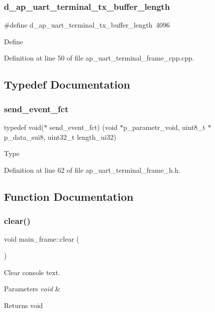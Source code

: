 \subsubsection{d\_ap\_uart\_terminal\_tx\_buffer\_length}
{\footnotesize\ttfamily \#define d\+\_\+ap\+\_\+uart\+\_\+terminal\+\_\+tx\+\_\+buffer\+\_\+length~4096}

Define 

Definition at line 50 of file ap\+\_\+uart\+\_\+terminal\+\_\+frame\+\_\+cpp.\+cpp.



\subsection{Typedef Documentation}
\mbox{\label{group___u_a_r_t__terminal_ga1d68ed9ea85b1c3bb5539abad6d7e4f1}} 
\subsubsection{send\_event\_fct}
{\footnotesize\ttfamily typedef void($\ast$ send\+\_\+event\+\_\+fct) (void $\ast$p\+\_\+parametr\+\_\+void, uint8\+\_\+t $\ast$p\+\_\+data\+\_\+sui8, uint32\+\_\+t length\+\_\+ui32)}

Type 

Definition at line 62 of file ap\+\_\+uart\+\_\+terminal\+\_\+frame\+\_\+h.\+h.



\subsection{Function Documentation}
\mbox{\label{group___u_a_r_t__terminal_ga89becf83437621d1d7fd6493951b8fec}} 
\subsubsection{clear()}
{\footnotesize\ttfamily void main\+\_\+frame\+::clear (\begin{DoxyParamCaption}\item[{void}]{ }\end{DoxyParamCaption})}



Clear console text. 


\begin{DoxyParams}{Parameters}
{\em void} & \\
\hline
\end{DoxyParams}
\begin{DoxyReturn}{Returns}
void 
\end{DoxyReturn}


